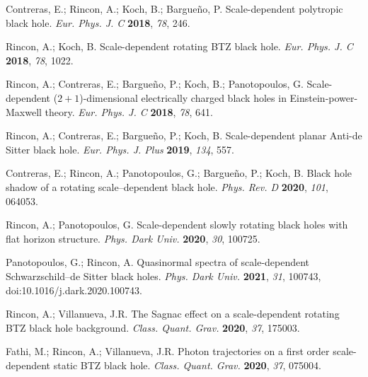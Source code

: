 \documentclass[aps,amsmath,amssymb,twocolumn]{revtex4}
\begin{document}
\begin{thebibliography}{999}
 Contreras, E.; Rincon, A.; Koch, B.; Bargue{\~n}o, P.  
Scale-dependent polytropic black hole.
\emph{Eur. Phys. J. C} \textbf{2018},  \emph{78},  246.

 Rincon, A.; Koch, B. 
Scale-dependent rotating BTZ black hole.
\emph{Eur. Phys. J. C}  \textbf{2018}, \emph{78},  1022.

 Rincon, A.; Contreras, E.; Bargue{\~n}o, P.; Koch, B.; Panotopoulos, G. 
Scale-dependent ($2+1$)-dimensional electrically charged black holes in Einstein-power-Maxwell theory.
\emph{Eur. Phys. J. C} \textbf{2018},  \emph{78},  641.
 
 Rincon, A.; Contreras, E.; Bargue{\~n}o, P.; Koch, B. 
Scale-dependent planar Anti-de Sitter black hole.
\emph{Eur. Phys. J. Plus} \textbf{2019},   \emph{134}, 557.

 Contreras, E.; Rincon, A.; Panotopoulos, G.; Bargue{\~n}o, P.; Koch, B. 
Black hole shadow of a rotating scale--dependent black hole.
\emph{Phys. Rev. D} \textbf{2020}, \emph{101},  064053.

 Rincon, A.; Panotopoulos, G. 
  Scale-dependent slowly rotating black holes with flat horizon structure.
  \emph{Phys. Dark Univ.}  \textbf{2020}, {\em 30}, 100725.

 Panotopoulos, G.; Rincon, A.  
  Quasinormal spectra of scale-dependent Schwarzschild--de Sitter black holes.
  \emph{Phys. Dark Univ.}  \textbf{2021}, {\em 31}, 100743,
  doi:10.1016/j.dark.2020.100743.
  
  
  Rincon, A.; Villanueva, J.R. 
  The Sagnac effect on a scale-dependent rotating BTZ black hole background.
  \emph{Class. Quant. Grav.}  \textbf{2020}, {\em 37},  175003. 
  
  Fathi, M.; Rincon, A.; Villanueva, J.R.  
  Photon trajectories on a first order scale-dependent static BTZ black hole.
  \emph{Class. Quant. Grav.} \textbf{2020}, {\em 37}, 075004. 
  

\end{thebibliography}
\end{document}
